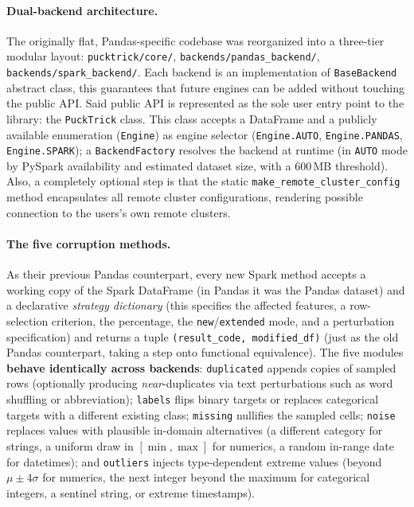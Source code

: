 \documentclass[a4paper, 9pt]{extarticle}
\begin{document}
\paragraph{Dual-backend architecture.}
The originally flat, Pandas-specific codebase was reorganized into a three-tier modular layout: \texttt{pucktrick/core/}, \texttt{backends/pandas\_backend/}, \texttt{backends/spark\_backend/}. Each backend is an implementation of \texttt{BaseBackend} abstract class, this guarantees that future engines can be added without touching the public API. Said public API is represented as the sole user entry point to the library: the \texttt{PuckTrick} class. This class accepts a DataFrame and a publicly available enumeration (\texttt{Engine}) as engine selector (\texttt{Engine.AUTO}, \texttt{Engine.PANDAS}, \texttt{Engine.SPARK}); a \texttt{BackendFactory} resolves the backend at runtime (in \texttt{AUTO} mode by PySpark availability and estimated dataset size, with a $600$\,MB threshold). Also, a completely optional step is that the static \texttt{make\_remote\_cluster\_config} method encapsulates all remote cluster configurations, rendering possible connection to the users's own remote clusters. 

\paragraph{The five corruption methods.}
As their previous Pandas counterpart, every new Spark method accepts a working copy of the Spark DataFrame (in Pandas it was the Pandas dataset) and a declarative \emph{strategy dictionary} (this specifies the affected features, a row-selection criterion, the percentage, the \texttt{new}/\texttt{extended} mode, and a perturbation specification) and returns a tuple \texttt{(result\_code, modified\_df)} (just as the old Pandas counterpart, taking a step onto functional equivalence). The five
modules \textbf{behave identically across backends}: \texttt{duplicated} appends copies of sampled rows (optionally producing \emph{near}-duplicates via text perturbations such as word shuffling or abbreviation); \texttt{labels} flips binary targets or
replaces categorical targets with a different existing class; \texttt{missing} nullifies the sampled cells; \texttt{noise} replaces values with plausible in-domain alternatives (a different category for strings, a uniform draw in $[\min,\max]$ for numerics, a random in-range date for datetimes); and \texttt{outliers} injects type-dependent extreme values (beyond $\mu\pm4\sigma$ for numerics, the next integer beyond the maximum for categorical integers, a sentinel string, or extreme timestamps). 
\end{document}
